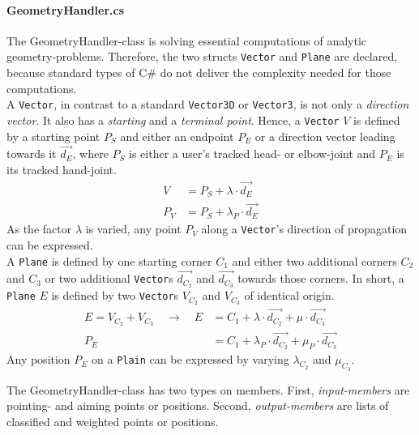\paragraph{GeometryHandler.cs} The GeometryHandler-class is solving essential computations of analytic geometry-problems. Therefore, the two structs \texttt{Vector} and \texttt{Plane} are declared, because standard types of C$\#$ do not deliver the complexity needed for those computations.
\\
A \texttt{Vector}, in contrast to a standard \texttt{Vector3D} or \texttt{Vector3}, is not only a \textit{direction vector}. It also has a \textit{starting} and a \textit{terminal point}. Hence, a \texttt{Vector} $V$ is defined by a starting point $P_{S}$ and either an endpoint $P_{E}$ or a direction vector leading towards it $\overrightarrow{d_{E}}$, where $P_{S}$ is either a user's tracked head- or elbow-joint and $P_{E}$ is its tracked hand-joint. 
\begin{align*}
	V &= P_{S} + \lambda \cdot \overrightarrow{d_{E}} \\
	P_{V} &= P_{S} + \lambda_{P} \cdot \overrightarrow{d_{E}}
\end{align*}
As the factor $\lambda$ is varied, any point $P_{V}$ along a \texttt{Vector}'s direction of propagation can be expressed. 
\\
A \texttt{Plane} is defined by one starting corner $C_{1}$ and either two additional corners $C_{2}$ and $C_{3}$ or two additional \texttt{Vector}s $\overrightarrow{d_{C_{2}}}$ and $\overrightarrow{d_{C_{3}}}$ towards those corners. In short, a \texttt{Plane} $E$ is defined by two \texttt{Vector}s $V_{C_{2}}$ and $V_{C_{3}}$ of identical origin.  
\begin{align*}
	E = V_{C_{2}} + V_{C_{3}} \quad \to \quad E &= C_{1} + \lambda \cdot \overrightarrow{d_{C_{2}}} + \mu \cdot \overrightarrow{d_{C_{3}}} \\
	P_{E} &= C_{1} + \lambda_{P} \cdot \overrightarrow{d_{C_{2}}} + \mu_{P} \cdot \overrightarrow{d_{C_{3}}}
\end{align*}
Any position $P_{E}$ on a \texttt{Plain} can be expressed by varying $\lambda_{C_{2}}$ and $\mu_{C_{3}}$.

The GeometryHandler-class has two types on members. First, \textit{input-members} are pointing- and aiming points or positions. Second, \textit{output-members} are lists of classified and weighted points or positions.

